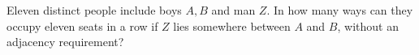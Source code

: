 Eleven distinct people include boys $A,B$ and man $Z$. In how many ways can they occupy eleven seats in a row if $Z$ lies somewhere between $A$ and $B$, without an adjacency requirement?
